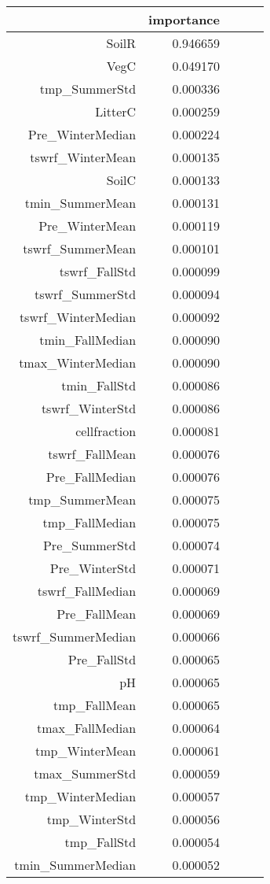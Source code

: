 \begin{tabular}{rrrrr}
\toprule
 & importance \\
\midrule
SoilR & 0.946659 \\
VegC & 0.049170 \\
tmp_SummerStd & 0.000336 \\
LitterC & 0.000259 \\
Pre_WinterMedian & 0.000224 \\
tswrf_WinterMean & 0.000135 \\
SoilC & 0.000133 \\
tmin_SummerMean & 0.000131 \\
Pre_WinterMean & 0.000119 \\
tswrf_SummerMean & 0.000101 \\
tswrf_FallStd & 0.000099 \\
tswrf_SummerStd & 0.000094 \\
tswrf_WinterMedian & 0.000092 \\
tmin_FallMedian & 0.000090 \\
tmax_WinterMedian & 0.000090 \\
tmin_FallStd & 0.000086 \\
tswrf_WinterStd & 0.000086 \\
cellfraction & 0.000081 \\
tswrf_FallMean & 0.000076 \\
Pre_FallMedian & 0.000076 \\
tmp_SummerMean & 0.000075 \\
tmp_FallMedian & 0.000075 \\
Pre_SummerStd & 0.000074 \\
Pre_WinterStd & 0.000071 \\
tswrf_FallMedian & 0.000069 \\
Pre_FallMean & 0.000069 \\
tswrf_SummerMedian & 0.000066 \\
Pre_FallStd & 0.000065 \\
pH & 0.000065 \\
tmp_FallMean & 0.000065 \\
tmax_FallMedian & 0.000064 \\
tmp_WinterMean & 0.000061 \\
tmax_SummerStd & 0.000059 \\
tmp_WinterMedian & 0.000057 \\
tmp_WinterStd & 0.000056 \\
tmp_FallStd & 0.000054 \\
tmin_SummerMedian & 0.000052 \\

\end{tabular}
